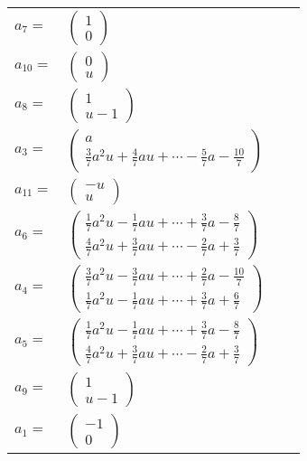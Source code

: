 \documentclass[1p]{elsarticle_modified}
\theoremstyle{definition}
\begin{document}
\begin{tabular}{m{7pt} m{180pt} m{7pt} m{180pt} }
\flushright $a_{7}=$&$\begin{pmatrix}1\\0\end{pmatrix}$ \\
\flushright $a_{10}=$&$\begin{pmatrix}0\\u\end{pmatrix}$ \\
\flushright $a_{8}=$&$\begin{pmatrix}1\\u-1\end{pmatrix}$ \\
\flushright $a_{3}=$&$\begin{pmatrix}a\\\frac{3}{7} a^2 u+\frac{4}{7} a u+\cdots-\frac{5}{7} a-\frac{10}{7}\end{pmatrix}$ \\
\flushright $a_{11}=$&$\begin{pmatrix}- u\\u\end{pmatrix}$ \\
\flushright $a_{6}=$&$\begin{pmatrix}\frac{1}{7} a^2 u-\frac{1}{7} a u+\cdots+\frac{3}{7} a-\frac{8}{7}\\\frac{4}{7} a^2 u+\frac{3}{7} a u+\cdots-\frac{2}{7} a+\frac{3}{7}\end{pmatrix}$ \\
\flushright $a_{4}=$&$\begin{pmatrix}\frac{3}{7} a^2 u-\frac{3}{7} a u+\cdots+\frac{2}{7} a-\frac{10}{7}\\\frac{1}{7} a^2 u-\frac{1}{7} a u+\cdots+\frac{3}{7} a+\frac{6}{7}\end{pmatrix}$ \\
\flushright $a_{5}=$&$\begin{pmatrix}\frac{1}{7} a^2 u-\frac{1}{7} a u+\cdots+\frac{3}{7} a-\frac{8}{7}\\\frac{4}{7} a^2 u+\frac{3}{7} a u+\cdots-\frac{2}{7} a+\frac{3}{7}\end{pmatrix}$ \\
\flushright $a_{9}=$&$\begin{pmatrix}1\\u-1\end{pmatrix}$ \\
\flushright $a_{1}=$&$\begin{pmatrix}-1\\0\end{pmatrix}$ \\

\end{tabular}
\end{document}
